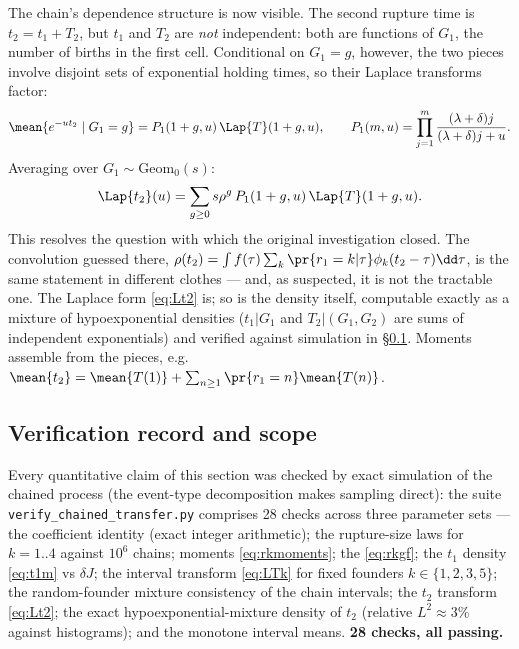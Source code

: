 The chain's dependence structure is now visible. The second rupture time is
$t_2=t_1+T_2$, but $t_1$ and $T_2$ are \emph{not} independent: both are
functions of $G_1$, the number of births in the first cell. Conditional on
$G_1=g$, however, the two pieces involve disjoint sets of exponential
holding times, so their Laplace transforms factor:
\begin{equation}
\mean{e^{-ut_2}\mid G_1=g}
=P_1(1+g,u)\,\Lap{T}(1+g,u),
\qquad
P_1(m,u)=\prod_{j=1}^{m}\frac{(\lambda+\delta)j}{(\lambda+\delta)j+u}.
\end{equation}
Averaging over $G_1\sim\mathrm{Geom}_0(s)$:
\begin{equation}
\Lap{t_2}(u)
=\sum_{g\ge0} s\rho^g\,P_1(1+g,u)\,\Lap{T}(1+g,u).
\label{eq:Lt2}
\end{equation}
This resolves the question with which the original investigation closed. The
convolution guessed there,
$\rho(t_2)=\int f(\tau)\sum_k\pr{r_1=k|\tau}\phi_k(t_2-\tau)\dd\tau$,
is the same statement in different clothes --- and, as suspected, it is not
the tractable one. The Laplace form \eqref{eq:Lt2} is; so is the density
itself, computable exactly as a mixture of hypoexponential densities
($t_1|G_1$ and $T_2|(G_1,G_2)$ are sums of independent exponentials) and
verified against simulation in \S\ref{sec:chained-verification}. Moments
assemble from the pieces, e.g.\
$\mean{t_2}=\mean{T(1)}+\sum_{n\ge1}\pr{r_1=n}\mean{T(n)}$.

\subsection{Verification record and scope}
\label{sec:chained-verification}

Every quantitative claim of this section was checked by exact simulation of
the chained process (the event-type decomposition makes sampling direct):
the suite \texttt{verify\_chained\_transfer.py} comprises 28 checks across
three parameter sets --- the coefficient identity (exact integer
arithmetic); the rupture-size laws for $k=1..4$ against $10^6$ chains;
moments \eqref{eq:rkmoments}; the \pgf{} \eqref{eq:rkgf}; the $t_1$ density
\eqref{eq:t1m} vs $\delta J$; the interval transform \eqref{eq:LTk} for
fixed founders $k\in\{1,2,3,5\}$; the random-founder mixture consistency of
the chain intervals; the $t_2$ transform \eqref{eq:Lt2}; the exact
hypoexponential-mixture density of $t_2$ (relative $L^2\approx3\%$ against
histograms); and the monotone interval means. \textbf{28 checks, all
passing.}

